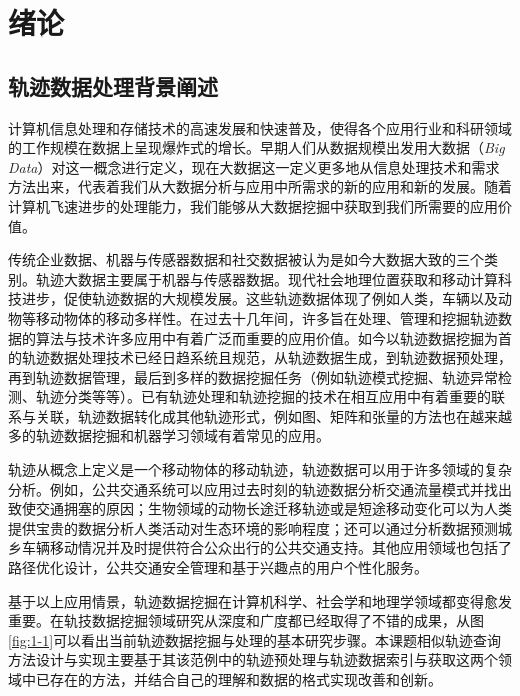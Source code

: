 

\chapter{绪论}
\label{chap:introduction}

\section{轨迹数据处理背景阐述}
\label{sec:background}

计算机信息处理和存储技术的高速发展和快速普及，使得各个应用行业和科研领域的工作规模在数据上呈现爆炸式的增长。早期人们从数据规模出发用大数据（\emph{Big Data}）对这一概念进行定义，现在大数据这一定义更多地从信息处理技术和需求方法出来，代表着我们从大数据分析与应用中所需求的新的应用和新的发展。随着计算机飞速进步的处理能力，我们能够从大数据挖掘中获取到我们所需要的应用价值。

传统企业数据、机器与传感器数据和社交数据被认为是如今大数据大致的三个类别。轨迹大数据主要属于机器与传感器数据。现代社会地理位置获取和移动计算科技进步，促使轨迹数据的大规模发展。这些轨迹数据体现了例如人类，车辆以及动物等移动物体的移动多样性。在过去十几年间，许多旨在处理、管理和挖掘轨迹数据的算法与技术许多应用中有着广泛而重要的应用价值。如今以轨迹数据挖掘为首的轨迹数据处理技术已经日趋系统且规范，从轨迹数据生成，到轨迹数据预处理，再到轨迹数据管理，最后到多样的数据挖掘任务（例如轨迹模式挖掘、轨迹异常检测、轨迹分类等等）。已有轨迹处理和轨迹挖掘的技术在相互应用中有着重要的联系与关联，轨迹数据转化成其他轨迹形式，例如图、矩阵和张量的方法也在越来越多的轨迹数据挖掘和机器学习领域有着常见的应用。

轨迹从概念上定义是一个移动物体的移动轨迹，轨迹数据可以用于许多领域的复杂分析。例如，公共交通系统可以应用过去时刻的轨迹数据分析交通流量模式并找出致使交通拥塞的原因；生物领域的动物长途迁移轨迹或是短途移动变化可以为人类提供宝贵的数据分析人类活动对生态环境的影响程度；还可以通过分析数据预测城乡车辆移动情况并及时提供符合公众出行的公共交通支持。其他应用领域也包括了路径优化设计，公共交通安全管理和基于兴趣点的用户个性化服务。

基于以上应用情景，轨迹数据挖掘在计算机科学、社会学和地理学领域都变得愈发重要。在轨技数据挖掘领域研究从深度和广度都已经取得了不错的成果，从图\ref{fig:1-1}\cite{zheng2015trajectory}可以看出当前轨迹数据挖掘与处理的基本研究步骤。本课题相似轨迹查询方法设计与实现主要基于其该范例中的轨迹预处理与轨迹数据索引与获取这两个领域中已存在的方法，并结合自己的理解和数据的格式实现改善和创新。

